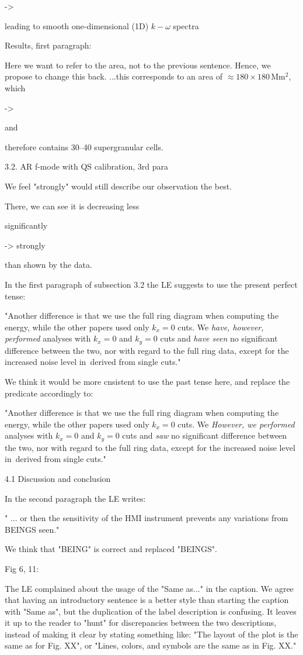 ->

leading to smooth one-dimensional (1D) $k-\omega$ spectra

Results, first paragraph:

Here we want to refer to the area, not to the previous sentence.
Hence, we propose to change this back.
...this corresponds to an area of $\approx 180 \times 180$\,Mm$^2$, 
which 

->

and 

therefore contains 30--40 supergranular cells.

3.2. AR f-mode with QS calibration, 3rd para

We feel "strongly" would still describe our observation the best.

There, we can see it is decreasing less 

significantly

->
strongly 

than shown by the data.

In the first paragraph of subsection 3.2 the LE suggests to use the present perfect tense:

"Another difference is that we use the
full ring diagram when computing the \fff energy, while the
other papers used only $k_x=0$ cuts. We 
\textsl{have, however, performed}
analyses with $k_x=0$ and $k_y=0$ cuts and 
\textsl{have seen} 
no significant
difference between the two, nor with regard to the full ring data, except for the
increased noise level in \ef\,derived from single cuts."

We think it would be more cnsistent to use the past tense here, and replace the predicate accordingly to:

"Another difference is that we use the
full ring diagram when computing the \fff energy, while the
other papers used only $k_x=0$ cuts. We 
\textsl{However, we performed}
analyses with $k_x=0$ and $k_y=0$ cuts and 
\textsl{saw} 
no significant
difference between the two, nor with regard to the full ring data, except for the
increased noise level in \ef\,derived from single cuts."

4.1 Discussion and conclusion

In the second paragraph the LE writes:

" ... or then the sensitivity of the HMI instrument prevents  any variations from BEINGS seen."

We think that "BEING" is correct and replaced "BEINGS".

Fig 6, 11:

The LE complained about the usage of the "Same as..." in the caption. We agree that having an introductory sentence is a better style than starting the caption with "Same as", but the duplication of the label description is confusing. It leaves it up to the reader to "hunt" for discrepancies between the two descriptions, instead of making it clear by stating something like: "The layout of the plot is the same as for Fig. XX", or "Lines, colors, and symbols are the same as in Fig. XX."

